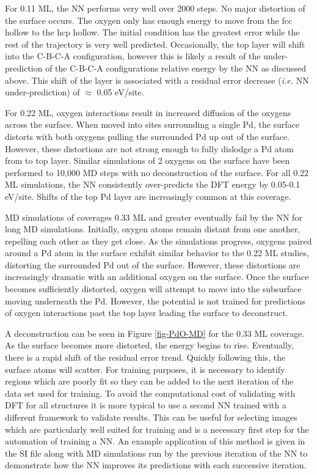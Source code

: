 \documentclass[12pt]{cmuthesis}
\begin{document}
For 0.11 ML, the NN performs very well over 2000 steps. No major distortion of the surface occurs. The oxygen only has enough energy to move from the fcc hollow to the hcp hollow. The initial condition has the greatest error while the rest of the trajectory is very well predicted. Occasionally, the top layer will shift into the C-B-C-A configuration, however this is likely a result of the under-prediction of the C-B-C-A configurations relative energy by the NN as discussed above. This shift of the layer is associated with a residual error decrease (\emph{i.e.} NN under-prediction) of \(\approx\) 0.05 eV/site.

For 0.22 ML, oxygen interactions result in increased diffusion of the oxygens across the surface. When moved into sites surrounding a single Pd, the surface distorts with both oxygens pulling the surrounded Pd up out of the surface. However, these distortions are not strong enough to fully dislodge a Pd atom from to top layer. Similar simulations of 2 oxygens on the surface have been performed to 10,000 MD steps with no deconstruction of the surface. For all 0.22 ML simulations, the NN consistently over-predicts the DFT energy by 0.05-0.1 eV/site. Shifts of the top Pd layer are increasingly common at this coverage.

MD simulations of coverages 0.33 ML and greater eventually fail by the NN for long MD simulations. Initially, oxygen atoms remain distant from one another, repelling each other as they get close. As the simulations progress, oxygens paired around a Pd atom in the surface exhibit similar behavior to the 0.22 ML studies, distorting the surrounded Pd out of the surface. However, these distortions are increasingly dramatic with an additional oxygen on the surface. Once the surface becomes sufficiently distorted, oxygen will attempt to move into the subsurface moving underneath the Pd. However, the potential is not trained for predictions of oxygen interactions past the top layer leading the surface to deconstruct.

A deconstruction can be seen in Figure \ref{fig-PdO-MD} for the 0.33 ML coverage. As the surface becomes more distorted, the energy begins to rise. Eventually, there is a rapid shift of the residual error trend. Quickly following this, the surface atoms will scatter. For training purposes, it is necessary to identify regions which are poorly fit so they can be added to the next iteration of the data set used for training. To avoid the computational cost of validating with DFT for all structures it is more typical to use a second NN trained with a different framework to validate results. This can be useful for selecting images which are particularly well suited for training and is a necessary first step for the automation of training a NN. An example application of this method is given in the SI file along with MD simulations run by the previous iteration of the NN to demonstrate how the NN improves its predictions with each successive iteration.
\end{document}

